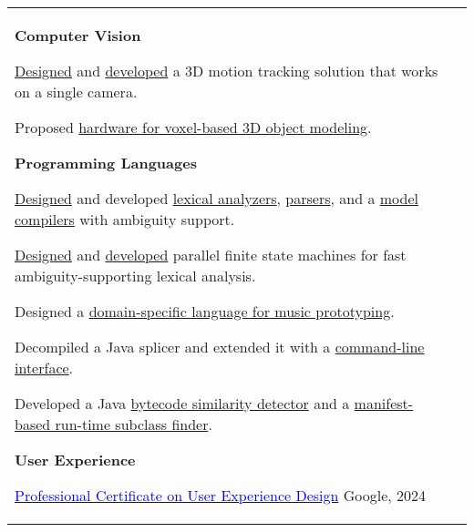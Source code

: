 \documentclass[letterpaper,10pt,oneside]{article}
\newcommand{\DatestampY}[1]{#1}
\newcommand{\itemspacingtwo}{\vspace{0.08cm}}
\newcommand{\sref}[2]{%
    \href{https://0/local/attachments/#1}{\textcolor{blue}{#2}}%
}
\newenvironment{body}
{\par\par
\begin{longtable}{p{0.145\textwidth}p{0.81\textwidth}}}
{\par\end{longtable}\par}
\begin{document}
\begin{body}
\textbf{Computer Vision}
\begin{comp}
\item \href{https://www.worldscientific.com/doi/abs/10.1142/S0129065712500190}{Designed} and \href{https://github.com/lquesada/MotionTracking}{developed} a 3D motion tracking solution that works on a single camera.
\item Proposed \href{https://www.tdcommons.org/dpubs_series/4167/}{hardware for voxel-based 3D object modeling}.
\end{comp}
\itemspacingtwo

\textbf{Programming Languages}
\begin{comp}
\item \href{https://www.worldscientific.com/doi/abs/10.1142/S0218194014500375}{Designed} and developed \href{https://github.com/lquesada/ModelCC/tree/master/ModelCC/src/org/modelcc/lexer}{lexical analyzers}, \href{https://github.com/lquesada/ModelCC/tree/master/ModelCC/src/org/modelcc/parser}{parsers}, and a \href{https://github.com/lquesada/ModelCC}{model compilers} with ambiguity support.
\item \href{https://www.scitepress.org/Link.aspx?doi=10.5220/0003949901050110}{Designed} and \href{https://github.com/lquesada/PFSMs-Java}{developed} parallel finite state machines for fast ambiguity-supporting lexical analysis.
\item Designed a \href{https://github.com/lquesada/ADAgio}{domain-specific language for music prototyping}.
\item Decompiled a Java splicer and extended it with a \href{https://github.com/lquesada/JarSplicePlus}{command-line interface}.
\item Developed a Java \href{https://github.com/lquesada/JSimil}{bytecode similarity detector} and a \href{https://github.com/lquesada/RunTimeSubclassFinder}{manifest-based run-time subclass finder}.
\end{comp}
\itemspacingtwo

\textbf{User Experience}
\begin{comp}
\item \sref{Certificate-Coursera-Google-UX-Design.pdf}{Professional Certificate on User Experience Design} \textemdash{ }Google, \DatestampY{2024}
\end{comp}
\itemspacingtwo


\end{body}
\end{document}
